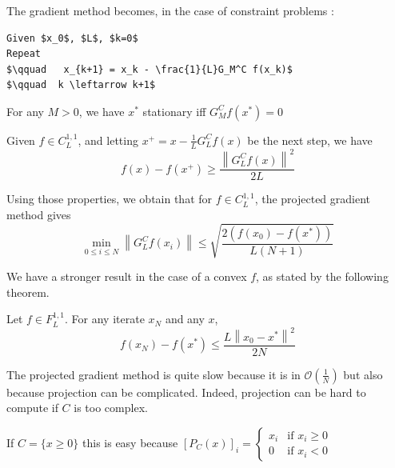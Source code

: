 
The gradient method becomes, in the case of constraint problems :

\begin{lstlisting}[mathescape,caption=Gradient Method - Constrained Problem]
Given $x_0$, $L$, $k=0$
Repeat
$\qquad   x_{k+1} = x_k - \frac{1}{L}G_M^C f(x_k)$
$\qquad  k \leftarrow k+1$
\end{lstlisting}


\begin{property}
For any $M>0$, we have $x^*$ stationary iff $G_M^C f(x^*)=0$
\end{property}

\begin{property}
Given $f \in C^{1,1}_L$, and letting $x^+ = x - \frac{1}{L}G^C_L f(x)$ be the next step, we have
\[
    f(x) - f(x^+) \ge \frac{\left\|G_L^C f(x)\right\|^2}{2L}
\]
\end{property}


\begin{theorem} Using those properties, we obtain that for $f \in C_L^{1,1}$, the projected gradient method gives
\begin{equation*}
\min_{0\leq i \leq N} \left\|G_L^C f(x_i)\right\| \leq \sqrt{\frac{2(f(x_0) - f(x^*))}{L(N+1)}}
\end{equation*}
\end{theorem}

We have a stronger result in the case of a convex $f$, as stated by the following theorem.
\begin{theorem}
Let $f \in F_L^{1,1}$. For any iterate $x_N$ and any $x$,
\begin{equation*}
f(x_N) - f(x^*) \leq \frac{L\left\|x_0 - x^*\right\|^2}{2N}
\end{equation*}
\end{theorem}


The projected gradient method is quite slow because it is in $\mathcal{O}(\frac{1}{N})$ but also because projection can be complicated. Indeed, projection can be hard to compute if $C$ is too complex.

\begin{example}
\begin{leftbar}
If $C=\{x\ge0\}$ this is easy because $[P_C(x)]_i=\left\lbrace
\begin{array}{ll}
x_i & \mbox{if $x_i \ge 0$}\\
0 & \mbox{if $x_i < 0$}
\end{array}
\right.$
\end{leftbar}
\end{example}

